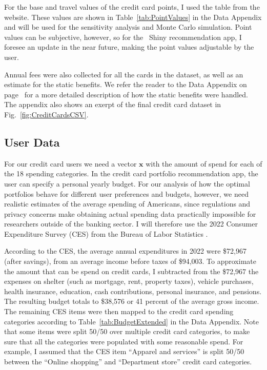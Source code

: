 For the base and travel values of the credit card points, I used the table from the \citet{nerdwallet:2024} website. 
These values are shown in Table~\ref{tab:PointValues} in the Data Appendix and will be used for the sensitivity analysis and Monte Carlo simulation.
Point values can be subjective, however, so for the \sR\ \textsf{Shiny} recommendation app, I foresee an update in the near future, making the point values adjustable by the user. 

Annual fees were also collected for all the cards in the dataset, as well as an estimate for the static benefits. 
We refer the reader to the Data Appendix on page~\pageref{app:Data} for a more detailed description of how the static benefits were handled. 
The appendix also shows an exerpt of the final credit card dataset in Fig.~\ref{fig:CreditCardsCSV}.


\subsection{User Data} \label{subsec:UserData}

For our credit card users we need a vector $\mathbf{x}$ with the amount of spend for each of the 18 spending categories. 
In the credit card portfolio recommendation app, the user can specify a personal yearly budget. 
For our analysis of how the optimal portfolios behave for different user preferences and budgets, however, we need realistic estimates of the average spending of Americans, since regulations and privacy concerns make obtaining actual spending data practically impossible for researchers outside of the banking sector.
I will therefore use the 2022 Consumer Expenditure Survey (CES) from the Bureau of Labor Statistics \citep{bls:2023}.

According to the CES, the average annual expenditures in 2022 were \$72,967 (after savings), from an average income before taxes of \$94,003.
To approximate the amount that can be spend on credit cards, I subtracted from the \$72,967 the expenses on shelter (such as mortgage, rent, property taxes), vehicle purchases, health insurance, education, cash contributions, personal insurance, and pensions.
The resulting budget totals to \$38,576 or 41 percent of the average gross income. 
The remaining CES items were then mapped to the credit card spending categories according to Table~\ref{tab:BudgetExtended} in the Data Appendix. Note that some items were split 50/50 over multiple credit card categories, to make sure that all the categories were populated with some reasonable spend. For example, I assumed that the CES item ``Apparel and services'' is split 50/50 between the ``Online shopping'' and ``Department store'' credit card categories. 


